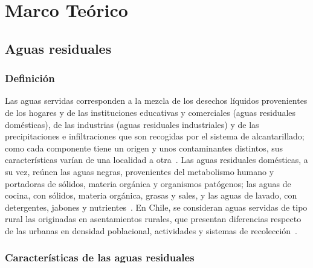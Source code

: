\chapter{Marco Teórico}
\label{cap:marco-teorico}



\section{Aguas residuales}
\label{sec:mt-aguas-residuales}

\subsection{Definición}

Las aguas servidas corresponden a la mezcla de los desechos líquidos provenientes de los hogares y de las instituciones educativas y comerciales (aguas residuales domésticas), de las industrias (aguas residuales industriales) y de las precipitaciones e infiltraciones que son recogidas por el sistema de alcantarillado; como cada componente tiene un origen y unos contaminantes distintos, sus características varían de una localidad a otra~\parencite{araya2014aguas}.
Las aguas residuales domésticas, a su vez, reúnen las aguas negras, provenientes del metabolismo humano y portadoras de sólidos, materia orgánica y organismos patógenos; las aguas de cocina, con sólidos, materia orgánica, grasas y sales, y las aguas de lavado, con detergentes, jabones y nutrientes~\parencite{araya2014aguas}.
En Chile, se consideran aguas servidas de tipo rural las originadas en asentamientos rurales, que presentan diferencias respecto de las urbanas en densidad poblacional, actividades y sistemas de recolección~\parencite{araya2014aguas}.

\subsection{Características de las aguas residuales}

